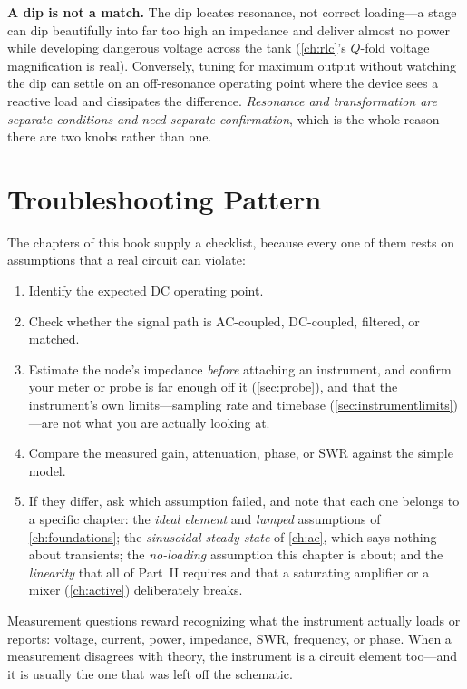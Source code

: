 \begin{mistakebox}
\textbf{A dip is not a match.} The dip locates resonance, not correct loading---a stage
can dip beautifully into far too high an impedance and deliver almost no power while
developing dangerous voltage across the tank (\cref{ch:rlc}'s \(Q\)-fold voltage
magnification is real). Conversely, tuning for maximum output without watching the dip
can settle on an off-resonance operating point where the device sees a reactive load
and dissipates the difference. \emph{Resonance and transformation are separate
conditions and need separate confirmation}, which is the whole reason there are two
knobs rather than one.
\end{mistakebox}

\section{Troubleshooting Pattern}
The chapters of this book supply a checklist, because every one of them rests on
assumptions that a real circuit can violate:
\begin{enumerate}
\item Identify the expected DC operating point.
\item Check whether the signal path is AC-coupled, DC-coupled, filtered, or matched.
\item Estimate the node's impedance \emph{before} attaching an instrument, and confirm
your meter or probe is far enough off it (\cref{sec:probe}), and that the instrument's own
limits---sampling rate and timebase (\cref{sec:instrumentlimits})---are not what you
are actually looking at.
\item Compare the measured gain, attenuation, phase, or SWR against the simple model.
\item If they differ, ask which assumption failed, and note that each one belongs to a
specific chapter: the \emph{ideal element} and \emph{lumped} assumptions of
\cref{ch:foundations}; the \emph{sinusoidal steady state} of \cref{ch:ac}, which says
nothing about transients; the \emph{no-loading} assumption this chapter is about; and
the \emph{linearity} that all of Part~II requires and that a saturating amplifier or a
mixer (\cref{ch:active}) deliberately breaks.
\end{enumerate}

\begin{exambox}
Measurement questions reward recognizing what the instrument actually loads or
reports: voltage, current, power, impedance, SWR, frequency, or phase. When a
measurement disagrees with theory, the instrument is a circuit element too---and it is
usually the one that was left off the schematic.
\end{exambox}

